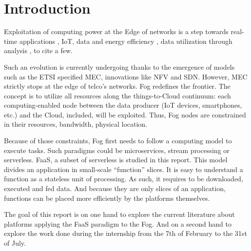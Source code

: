 \section{Introduction}
Exploitation of computing power at the Edge of networks is a step towards real-time applications \cite{rausch_towards_2021,lin_cloudfog_2017}, \gls{IoT}, data and energy efficiency \cite{ieee_standards_association_ieee_2018}, data utilization through analysis \cite{openfog_consortium_real-time_2018}, to cite a few.

Such an evolution is currently undergoing thanks to the emergence of models such as the \gls{ETSI} specified \gls{MEC}, innovations like \gls{NFV} and \gls{SDN}. However, \gls{MEC} strictly stops at the edge of telco’s networks. Fog redefines the frontier. The concept is to utilize all resources along the things-to-Cloud continuum: each computing-enabled node between the data producer (\gls{IoT} devices, smartphones, etc.) and the Cloud, included, will be exploited. Thus, Fog nodes are constrained in their resources, bandwidth, physical location.

Because of those constraints, Fog first needs to follow a computing model to execute tasks. Such paradigms could be microservices, stream processing or serverless. \gls{FaaS}, a subset of serverless is studied in this report. This model divides an application in small-scale “function” slices. It is easy to understand a function as a stateless unit of processing. As such, it requires to be downloaded, executed and fed data. And because they are only slices of an application, functions can be placed more efficiently by the platforms themselves.

The goal of this report is on one hand to explore the current literature about platforms applying the \gls{FaaS} paradigm to the Fog. And on a second hand to explore the work done during the internship from the 7th of February to the 31st of July.

